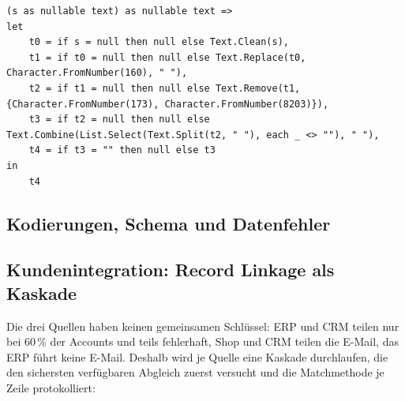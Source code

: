 
\begin{lstlisting}[language=PowerQueryM, caption={Hilfsfunktion \pq{fnClean}: unsichtbare Zeichen und Mehrfach-Leerzeichen entfernen}, label={lst:fnclean}]
(s as nullable text) as nullable text =>
let
    t0 = if s = null then null else Text.Clean(s),
    t1 = if t0 = null then null else Text.Replace(t0, Character.FromNumber(160), " "),
    t2 = if t1 = null then null else Text.Remove(t1, {Character.FromNumber(173), Character.FromNumber(8203)}),
    t3 = if t2 = null then null else Text.Combine(List.Select(Text.Split(t2, " "), each _ <> ""), " "),
    t4 = if t3 = "" then null else t3
in
    t4
\end{lstlisting}

\subsection{Kodierungen, Schema und Datenfehler}\label{sec:schema}



\subsection{Kundenintegration: Record Linkage als Kaskade}\label{sec:linkage}


Die drei Quellen haben keinen gemeinsamen Schlüssel: ERP und CRM teilen  nur bei 60\,\% der Accounts und teils fehlerhaft, Shop und CRM teilen die E-Mail, das ERP führt keine E-Mail. Deshalb wird je Quelle eine Kaskade durchlaufen, die den sichersten verfügbaren Abgleich zuerst versucht und die Matchmethode je Zeile protokolliert:

